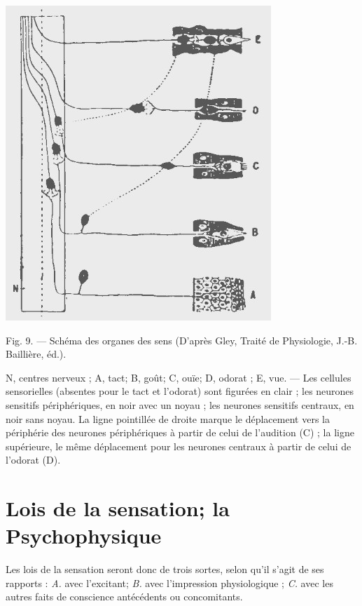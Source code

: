 \begin{minipage}[c]{.45\linewidth}
\begin{center}
\includegraphics[scale=0.3]{./05_sensible/009}
\end{center}
Fig. 9. — Schéma des organes des sens
(D'après Gley, Traité de Physiologie, J.-B. Baillière, éd.).
\end{minipage}
\hfill
\begin{minipage}[c]{.45\linewidth}
N, centres nerveux ; A, tact; B, goût;
C, ouïe; D, odorat ; E, vue. — Les cellules 
sensorielles (absentes pour le tact et l'odorat) 
sont figurées en clair ; les neurones sensitifs
périphériques, en noir avec un noyau ; 
les neurones sensitifs centraux, en noir 
sans noyau. La ligne pointillée de droite
marque le déplacement vers la périphérie des neurones périphériques à partir de celui 
de l'audition (C) ; la ligne supérieure, le
même déplacement pour les neurones centraux à partir de celui de l'odorat (D).
\end{minipage}


\section{Lois de la sensation; la Psychophysique}%
Les lois de
la sensation seront donc de trois sortes, selon qu’il s’agit de ses rapports :
{\it A.} avec l’excitant; {\it B.} avec l'impression physiologique ;
{\it C.} avec les autres faits de conscience antécédents ou concomitants.

